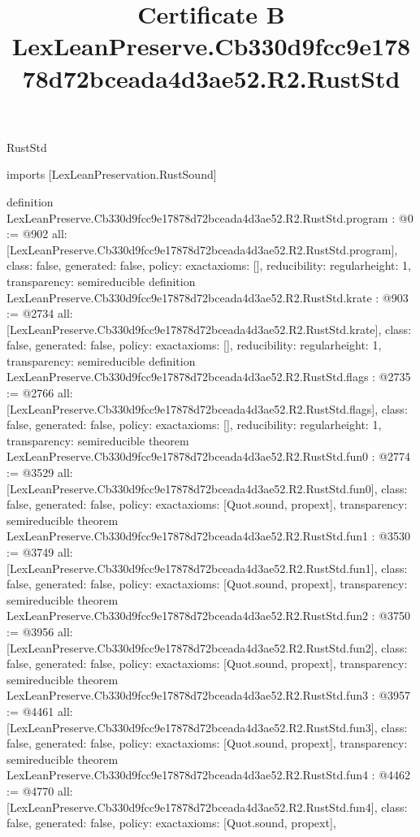 \begin{lexlean}{RustStd}
\title{Certificate B LexLeanPreserve.Cb330d9fcc9e17878d72bceada4d3ae52.R2.RustStd}
\begin{coremodule}
imports [LexLeanPreservation.RustSound]

definition LexLeanPreserve.Cb330d9fcc9e17878d72bceada4d3ae52.R2.RustStd.program : @0 := @902 {
  all: [LexLeanPreserve.Cb330d9fcc9e17878d72bceada4d3ae52.R2.RustStd.program],
  class: false,
  generated: false,
  policy: exact{axioms: []},
  reducibility: regular{height: 1},
  transparency: semireducible
}
definition LexLeanPreserve.Cb330d9fcc9e17878d72bceada4d3ae52.R2.RustStd.krate : @903 := @2734 {
  all: [LexLeanPreserve.Cb330d9fcc9e17878d72bceada4d3ae52.R2.RustStd.krate],
  class: false,
  generated: false,
  policy: exact{axioms: []},
  reducibility: regular{height: 1},
  transparency: semireducible
}
definition LexLeanPreserve.Cb330d9fcc9e17878d72bceada4d3ae52.R2.RustStd.flags : @2735 := @2766 {
  all: [LexLeanPreserve.Cb330d9fcc9e17878d72bceada4d3ae52.R2.RustStd.flags],
  class: false,
  generated: false,
  policy: exact{axioms: []},
  reducibility: regular{height: 1},
  transparency: semireducible
}
theorem LexLeanPreserve.Cb330d9fcc9e17878d72bceada4d3ae52.R2.RustStd.fun0 : @2774 := @3529 {
  all: [LexLeanPreserve.Cb330d9fcc9e17878d72bceada4d3ae52.R2.RustStd.fun0],
  class: false,
  generated: false,
  policy: exact{axioms: [Quot.sound, propext]},
  transparency: semireducible
}
theorem LexLeanPreserve.Cb330d9fcc9e17878d72bceada4d3ae52.R2.RustStd.fun1 : @3530 := @3749 {
  all: [LexLeanPreserve.Cb330d9fcc9e17878d72bceada4d3ae52.R2.RustStd.fun1],
  class: false,
  generated: false,
  policy: exact{axioms: [Quot.sound, propext]},
  transparency: semireducible
}
theorem LexLeanPreserve.Cb330d9fcc9e17878d72bceada4d3ae52.R2.RustStd.fun2 : @3750 := @3956 {
  all: [LexLeanPreserve.Cb330d9fcc9e17878d72bceada4d3ae52.R2.RustStd.fun2],
  class: false,
  generated: false,
  policy: exact{axioms: [Quot.sound, propext]},
  transparency: semireducible
}
theorem LexLeanPreserve.Cb330d9fcc9e17878d72bceada4d3ae52.R2.RustStd.fun3 : @3957 := @4461 {
  all: [LexLeanPreserve.Cb330d9fcc9e17878d72bceada4d3ae52.R2.RustStd.fun3],
  class: false,
  generated: false,
  policy: exact{axioms: [Quot.sound, propext]},
  transparency: semireducible
}
theorem LexLeanPreserve.Cb330d9fcc9e17878d72bceada4d3ae52.R2.RustStd.fun4 : @4462 := @4770 {
  all: [LexLeanPreserve.Cb330d9fcc9e17878d72bceada4d3ae52.R2.RustStd.fun4],
  class: false,
  generated: false,
  policy: exact{axioms: [Quot.sound, propext]},
}
\end{coremodule}
\end{lexlean}
